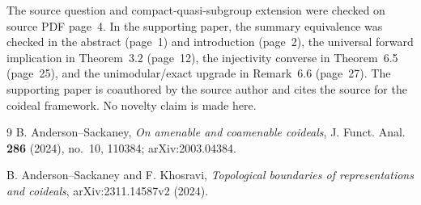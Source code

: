 \documentclass[11pt]{article}
\begin{document}
The source question and compact-quasi-subgroup extension were checked on
source PDF page~4.  In the supporting paper, the summary equivalence was
checked in the abstract (page~1) and introduction (page~2), the universal
forward implication in Theorem~3.2 (page~12), the injectivity converse in
Theorem~6.5 (page~25), and the unimodular/exact upgrade in Remark~6.6
(page~27).  The supporting paper is coauthored by the source author and cites
the source for the coideal framework.  No novelty claim is made here.

\begin{thebibliography}{9}
B. Anderson--Sackaney,
\emph{On amenable and coamenable coideals},
J. Funct. Anal. \textbf{286} (2024), no.~10, 110384;
arXiv:2003.04384.

B. Anderson--Sackaney and F. Khosravi,
\emph{Topological boundaries of representations and coideals},
arXiv:2311.14587v2 (2024).
\end{thebibliography}
\end{document}
